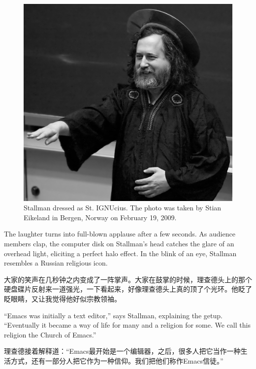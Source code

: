 \ifdefined\eng
\begin{figure}[ht] \centering
  \includegraphics{stignucius}
  \caption{Stallman dressed as St. IGNUcius. The photo was taken by Stian Eikeland in Bergen, Norway on February 19, 2009.}
\end{figure}
\fi

\ifdefined\chs

\fi

\ifdefined\eng
The laughter turns into full-blown applause after a few seconds. As audience members clap, the computer disk on Stallman's head catches the glare of an overhead light, eliciting a perfect halo effect. In the blink of an eye, Stallman resembles a Russian religious icon.
\fi

\ifdefined\chs
大家的笑声在几秒钟之内变成了一阵掌声。大家在鼓掌的时候，理查德头上的那个硬盘碟片反射来一道强光，一下看起来，好像理查德头上真的顶了个光环。他眨了眨眼睛，又让我觉得他好似宗教领袖。
\fi

\ifdefined\eng
``Emacs was initially a text editor,'' says Stallman, explaining the getup. ``Eventually it became a way of life for many and a religion for some. We call this religion the Church of Emacs.''
\fi

\ifdefined\chs
理查德接着解释道：“Emacs最开始是一个编辑器，之后，很多人把它当作一种生活方式，还有一部分人把它作为一种信仰。我们把他们称作Emacs信徒。”
\fi

